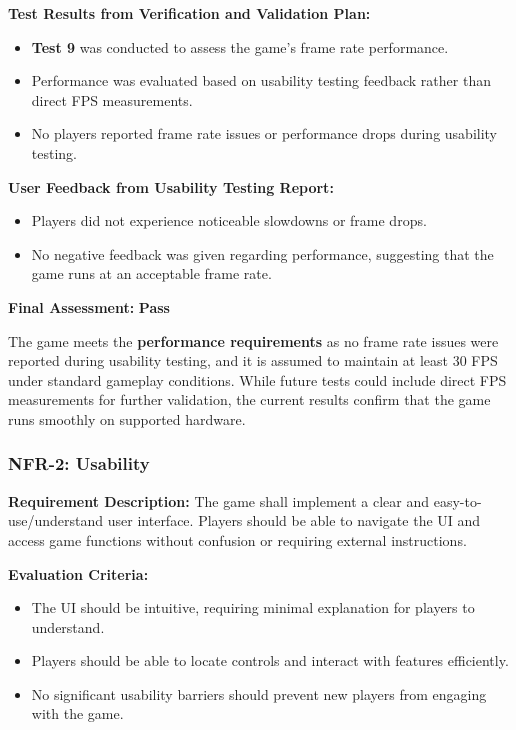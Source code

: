 \documentclass[12pt, titlepage]{article}
\begin{document}
\textbf{Test Results from Verification and Validation Plan:}  
\begin{itemize}
    \item \textbf{Test 9} was conducted to assess the game's frame rate performance.
    \item Performance was evaluated based on usability testing feedback rather than direct FPS measurements.
    \item No players reported frame rate issues or performance drops during usability testing.
\end{itemize}

\textbf{User Feedback from Usability Testing Report:}  
\begin{itemize}
    \item Players did not experience noticeable slowdowns or frame drops.
    \item No negative feedback was given regarding performance, suggesting that the game runs at an acceptable frame rate.
\end{itemize}

\textbf{Final Assessment:} \textbf{Pass}  

The game meets the \textbf{performance requirements} as no frame rate issues were reported during usability testing, and it is assumed to maintain at least 30 FPS under standard gameplay conditions. While future tests could include direct FPS measurements for further validation, the current results confirm that the game runs smoothly on supported hardware.


\subsubsection{NFR-2: Usability}
\label{NFR2}

\textbf{Requirement Description:}  
The game shall implement a clear and easy-to-use/understand user interface. Players should be able to navigate the UI and access game functions without confusion or requiring external instructions.

\textbf{Evaluation Criteria:}  
\begin{itemize}
    \item The UI should be intuitive, requiring minimal explanation for players to understand.
    \item Players should be able to locate controls and interact with features efficiently.
    \item No significant usability barriers should prevent new players from engaging with the game.
\end{itemize}
\end{document}

